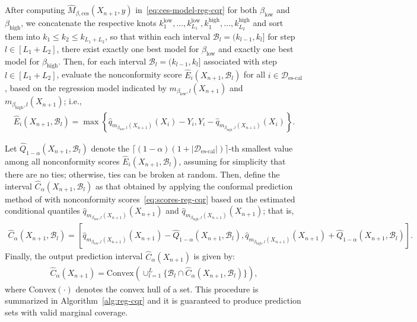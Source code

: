 After computing $\hat{M}_{\beta, \text{ces}}(X_{n+1},y)$ in~\eqref{eq:ces-model-reg-cqr} for both  $\beta_{\text{low}}$ and $\beta_{\text{high}}$, we concatenate the respective knots $k_1^{\text{low}}, \dots, k^{\text{low}}_{L_1}, k_1^{\text{high}}, \dots, k_{L_2}^{\text{high}}$ and sort them into $k_1 \leq k_2 \leq k_{L_1+L_2}$, so that within each interval $\mathcal{B}_l = (k_{l-1}, k_{l}]$ for step $l \in [L_1 + L_2]$, there exist exactly one best model for $\beta_{\text{low}}$ and exactly one best model for $\beta_{\text{high}}$. 
Then, for each interval $\mathcal{B}_l = (k_{l-1}, k_{l}]$ associated with step $l \in[L_1 + L_2]$, evaluate the nonconformity score $\hat{E}_i(X_{n+1}, \mathcal{B}_l)$ for all $i \in \mathcal{D}_{\text{es-cal}}$, based on the regression model indicated by $m_{\beta_{\text{low}},l}(X_{n+1})$ and $m_{\beta_{\text{high}},l}(X_{n+1})$; i.e.,
\begin{align} \label{eq:scores-reg-cqr}
  \hat{E}_i(X_{n+1}, \mathcal{B}_l) = \max\left\{\hat{q}_{m_{\beta_{\text{low}},l}(X_{n+1})}(X_i) - Y_i, Y_i - \hat{q}_{m_{\beta_{\text{high}},l}(X_{n+1})}(X_i)\right\}.
\end{align}


Let $\hat{Q}_{1-\alpha}(X_{n+1},\mathcal{B}_l)$ denote the $\lceil (1-\alpha)(1+|\mathcal{D}_{\text{es-cal}}|) \rceil$-th smallest value among all nonconformity scores $\hat{E}_i(X_{n+1},\mathcal{B}_l)$, assuming for simplicity that there are no ties; otherwise, ties can be broken at random. 
Then, define the interval $\hat{C}_{\alpha}(X_{n+1}, \mathcal{B}_l)$ as that obtained by applying the conformal prediction method of \citet{romano2019conformalized} with nonconformity scores~\eqref{eq:scores-reg-cqr} based on the estimated conditional quantiles $\hat{q}_{m_{\beta_{\text{low}},l}(X_{n+1})}(X_{n+1})$ and $\hat{q}_{m_{\beta_{\text{high}},l}(X_{n+1})}(X_{n+1})$; that is,
\begin{align} \label{eq:reg-int-tmp-cqr}
  \hat{C}_{\alpha}(X_{n+1}, \mathcal{B}_l) = [\hat{q}_{m_{\beta_{\text{low}},l}(X_{n+1})}(X_{n+1}) - \hat{Q}_{1-\alpha}(X_{n+1},\mathcal{B}_l), \hat{q}_{m_{\beta_{\text{high}},l}(X_{n+1})}(X_{n+1}) + \hat{Q}_{1-\alpha}(X_{n+1},\mathcal{B}_l)].
\end{align}
Finally, the output prediction interval $\hat{C}_{\alpha}(X_{n+1})$ is given by:
\begin{align} \label{eq:reg-int-cqr}
  \hat{C}_{\alpha}(X_{n+1}) = \text{Convex}\left( \cup_{l=1}^{L} \{ \mathcal{B}_l \cap \hat{C}_{\alpha}(X_{n+1}, \mathcal{B}_l) \} \right),
\end{align}
where $\text{Convex}(\cdot)$ denotes the convex hull of a set.
This procedure is summarized in Algorithm~\ref{alg:reg-cqr} and it is guaranteed to produce prediction sets with valid marginal coverage.

